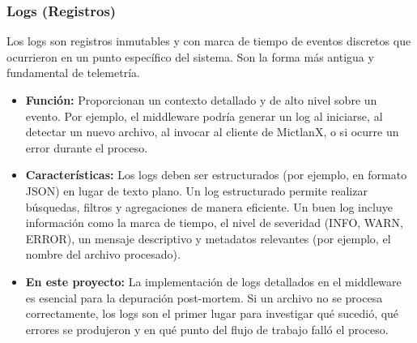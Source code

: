\subsubsection{Logs (Registros)}
Los logs son registros inmutables y con marca de tiempo de eventos discretos que ocurrieron en un punto específico del sistema. Son la forma más antigua y fundamental de telemetría.
\begin{itemize}
    \item \textbf{Función:} Proporcionan un contexto detallado y de alto nivel sobre un evento. Por ejemplo, el middleware podría generar un log al iniciarse, al detectar un nuevo archivo, al invocar al cliente de MictlanX, o si ocurre un error durante el proceso.
    \item \textbf{Características:} Los logs deben ser estructurados (por ejemplo, en formato JSON) en lugar de texto plano. Un log estructurado permite realizar búsquedas, filtros y agregaciones de manera eficiente. Un buen log incluye información como la marca de tiempo, el nivel de severidad (INFO, WARN, ERROR), un mensaje descriptivo y metadatos relevantes (por ejemplo, el nombre del archivo procesado).
    \item \textbf{En este proyecto:} La implementación de logs detallados en el middleware es esencial para la depuración post-mortem. Si un archivo no se procesa correctamente, los logs son el primer lugar para investigar qué sucedió, qué errores se produjeron y en qué punto del flujo de trabajo falló el proceso.
\end{itemize}

